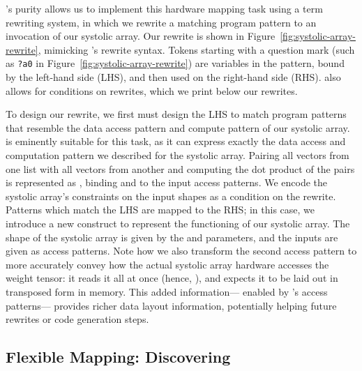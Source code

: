 \g's purity
  allows us to implement this hardware mapping task
  using a term rewriting system,
  in which we rewrite a matching program pattern
  to an invocation of our systolic array.
Our rewrite is shown in 
  Figure~\ref{fig:systolic-array-rewrite},
  mimicking
  's rewrite syntax.
Tokens starting with a question mark
  (such as \texttt{?a0} in 
  Figure~\ref{fig:systolic-array-rewrite})
  are variables in the pattern,
  bound by the left-hand side (LHS),
  and then used on the right-hand side (RHS).
 also allows for
  conditions on rewrites,
  which we print below our rewrites.

To design our rewrite,
  we first must design
  the LHS
  to match program patterns
  that resemble the data access pattern
  and compute pattern
  of our systolic array.
\g is eminently suitable for this task,
  as it can express
  exactly the data access
  and computation pattern
  we described
  for the systolic array.
Pairing all vectors from one list
  with all vectors from another
  and computing the dot product
  of the pairs
  is represented as
  ,
  binding
  and 
  to the input access patterns.
We encode
  the systolic array's
  constraints
  on the input shapes
  as a condition on the rewrite.
Patterns which match the LHS
  are mapped to the RHS;
  in this case, we introduce a new
   construct
  to represent the functioning of our systolic array.
The shape of the systolic array 
  is given by the  and 
  parameters,
  and the inputs are given
  as access patterns.
Note how we also transform
  the second access pattern
  to more accurately convey
  how the actual systolic array
  hardware
  accesses the weight tensor:
  it reads it all at once
  (hence, ),
  and expects it to be laid out
  in transposed form
  in memory.
This added information---%
  enabled by \g's access patterns---%
  provides richer data layout information,
  potentially helping future rewrites
  or code generation steps.
 
\subsection{Flexible Mapping: Discovering \itc{}}
\label{sec:discovering-im2col}

